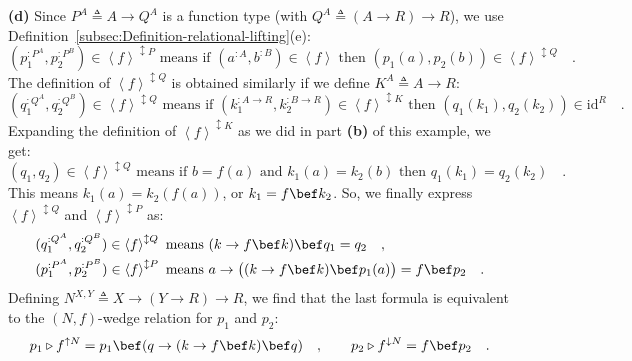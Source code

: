 \textbf{(d)} Since $P^{A}\triangleq A\rightarrow Q^{A}$ is a function
type (with $Q^{A}\triangleq\left(A\rightarrow R\right)\rightarrow R$),
we use Definition~\ref{subsec:Definition-relational-lifting}(e):
\[
(p_{1}^{:P^{A}},p_{2}^{:P^{B}})\in\left<f\right>^{\updownarrow P}\text{ means if }(a^{:A},b^{:B})\in\left<f\right>\text{ then }(p_{1}(a),p_{2}(b))\in\left<f\right>^{\updownarrow Q}\quad.
\]
The definition of $\left<f\right>^{\updownarrow Q}$ is obtained similarly
if we define $K^{A}\triangleq A\rightarrow R$:
\[
(q_{1}^{:Q^{A}},q_{2}^{:Q^{B}})\in\left<f\right>^{\updownarrow Q}\text{ means if }(k_{1}^{:A\rightarrow R},k_{2}^{:B\rightarrow R})\in\left<f\right>^{\updownarrow K}\text{ then }(q_{1}(k_{1}),q_{2}(k_{2}))\in\text{id}^{R}\quad.
\]
Expanding the definition of $\left<f\right>^{\updownarrow K}$ as
we did in part \textbf{(b)} of this example, we get:
\[
(q_{1},q_{2})\in\left<f\right>^{\updownarrow Q}\text{ means if }b=f(a)\text{ and }k_{1}(a)=k_{2}(b)\text{ then }q_{1}(k_{1})=q_{2}(k_{2})\quad.
\]
This means $k_{1}(a)=k_{2}(f(a))$, or $k_{1}=f\bef k_{2}$. So, we
finally express $\left<f\right>^{\updownarrow Q}$ and $\left<f\right>^{\updownarrow P}$
as:
\begin{align*}
 & (q_{1}^{:Q^{A}},q_{2}^{:Q^{B}})\in\left<f\right>^{\updownarrow Q}\text{ means }(k\rightarrow f\bef k)\bef q_{1}=q_{2}\quad,\\
 & (p_{1}^{:P^{A}},p_{2}^{:P^{B}})\in\left<f\right>^{\updownarrow P}\text{ means }a\rightarrow\big((k\rightarrow f\bef k)\bef p_{1}(a)\big)=f\bef p_{2}\quad.
\end{align*}
Defining $N^{X,Y}\triangleq X\rightarrow\left(Y\rightarrow R\right)\rightarrow R$,
we find that the last formula is equivalent to the $\left(N,f\right)$-wedge
relation for $p_{1}$ and $p_{2}$:
\[
p_{1}\triangleright f^{\uparrow N}=p_{1}\bef(q\rightarrow(k\rightarrow f\bef k)\bef q)\quad,\quad\quad p_{2}\triangleright f^{\downarrow N}=f\bef p_{2}\quad.
\]
 

